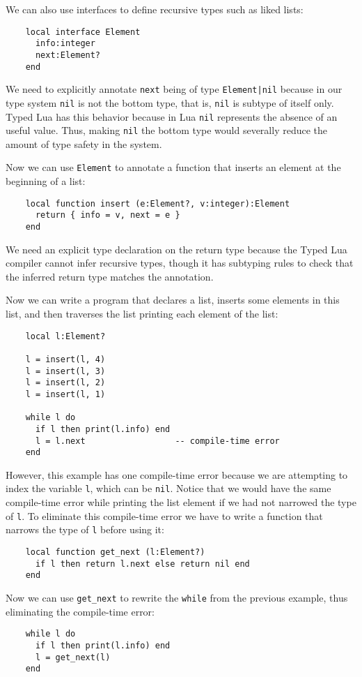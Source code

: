 We can also use interfaces to define recursive types such as liked lists:
\begin{verbatim}
    local interface Element
      info:integer
      next:Element?
    end
\end{verbatim}

We need to explicitly annotate \texttt{next} being of type
\texttt{Element|nil} because in our type system \texttt{nil}
is not the bottom type, that is, \texttt{nil} is subtype of itself only.
Typed Lua has this behavior because in Lua \texttt{nil} represents
the absence of an useful value.
Thus, making \texttt{nil} the bottom type would severally reduce the amount
of type safety in the system.

Now we can use \texttt{Element} to annotate a function that
inserts an element at the beginning of a list:
\begin{verbatim}
    local function insert (e:Element?, v:integer):Element 
      return { info = v, next = e }
    end
\end{verbatim}

We need an explicit type declaration on the return type because
the Typed Lua compiler cannot infer recursive types, though
it has subtyping rules to check that the inferred return type
matches the annotation.

Now we can write a program that declares a list, inserts some
elements in this list, and then traverses the list printing
each element of the list:
\begin{verbatim}
    local l:Element?

    l = insert(l, 4)
    l = insert(l, 3)
    l = insert(l, 2)
    l = insert(l, 1)

    while l do
      if l then print(l.info) end
      l = l.next                  -- compile-time error
    end
\end{verbatim}

However, this example has one compile-time error because we
are attempting to index the variable \texttt{l},
which can be \texttt{nil}.
Notice that we would have the same compile-time error while
printing the list element if we had not narrowed the type of
\texttt{l}.
To eliminate this compile-time error we have to write a
function that narrows the type of \texttt{l} before using it:
\begin{verbatim}
    local function get_next (l:Element?)
      if l then return l.next else return nil end
    end
\end{verbatim}

Now we can use \texttt{get\string_next} to rewrite the \texttt{while}
from the previous example, thus eliminating the compile-time error:
\begin{verbatim}
    while l do
      if l then print(l.info) end
      l = get_next(l)
    end
\end{verbatim}

